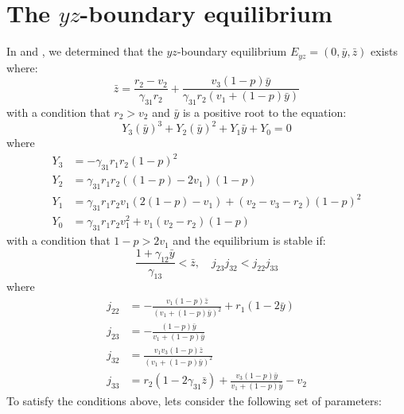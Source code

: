 \section{The $yz$-boundary equilibrium}\label{sec:numsim_yz_boundary_equilibrium}
In  and , we determined that the $yz$-boundary equilibrium $E_{yz}=\left(0,\bar{y},\bar{z}\right)$ exists where:
\[
\bar{z}=\frac{r_2-v_2}{\gamma_{31}r_2}+\frac{v_3\left(1-p\right)\bar{y}}{\gamma_{31}r_2\left(v_1+\left(1-p\right)\bar{y}\right)}
\]
with a condition that $r_2>v_2$ and $\bar{y}$ is a positive root to the equation:
\begin{equation*}
    Y_3\left(\bar{y}\right)^3+Y_2\left(\bar{y}\right)^2+Y_1\bar{y}+Y_0=0
\end{equation*}
where
\begin{align*}
    Y_3 &= -\gamma_{31}r_1r_2\left(1-p\right)^2\\
    Y_2 &= \gamma_{31}r_1r_2\left(\left(1-p\right)-2v_1\right)\left(1-p\right)\\
    Y_1 &= \gamma_{31}r_1r_2v_1\left(2\left(1-p\right)-v_1\right)+\left(v_2-v_3-r_2\right)\left(1-p\right)^2\\
    Y_0 &= \gamma_{31}r_1r_2v_1^2+v_1\left(v_2-r_2\right)\left(1-p\right)
\end{align*}
with a condition that $1-p>2v_1$ and the equilibrium is stable if:
\[
\frac{1+\gamma_{12}\bar{y}}{\gamma_{13}}<\bar{z},\quad 
j_{23}j_{32}<j_{22}j_{33}
\]
where
\begin{align*}
    j_{22} &= -\frac{v_1\left(1-p\right)\bar{z}}{\left(v_1+\left(1-p\right)\bar{y}\right)^2}+r_1\left(1-2\bar{y}\right)\\
    j_{23} &= -\frac{\left(1-p\right)\bar{y}}{v_1+\left(1-p\right)\bar{y}}\\
    j_{32} &= \frac{v_1v_3\left(1-p\right)\bar{z}}{\left(v_1+\left(1-p\right)\bar{y}\right)^2}\\
    j_{33} &= r_2\left(1-2\gamma_{31}\bar{z}\right)+\frac{v_3\left(1-p\right)\bar{y}}{v_1+\left(1-p\right)\bar{y}}-v_2
\end{align*}
To satisfy the conditions above, lets consider the following set of parameters:
